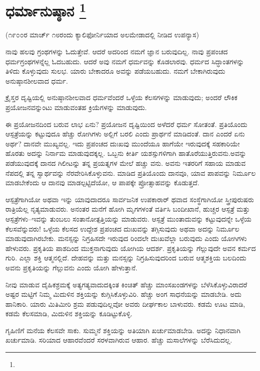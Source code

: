 
\chapter[ಧರ್ಮಾನುಷ್ಠಾನ ]{ಧರ್ಮಾನುಷ್ಠಾನ \protect\footnote{}}

\centerline{(೧೯೦೦ರ ಮಾರ್ಚ್​ ೧೮ರಂದು ಕ್ಯಾಲಿಫೋರ್ನಿಯಾದ ಅಲಮೇಡಾದಲ್ಲಿ ನೀಡಿದ ಉಪನ್ಯಾಸ)}

ನಾವು ಹಲವು ಗ್ರಂಥಗಳನ್ನು ಓದುತ್ತೇವೆ. ಆದರೆ ಅದರಿಂದ ನಮಗೆ ಜ್ಞಾನ ಬರುವುದಿಲ್ಲ. ನಾವು ಪ್ರಪಂಚದ ಧರ್ಮಗ್ರಂಥಗಳನ್ನೆಲ್ಲ ಓದಬಹುದು. ಆದರೆ ಅವು ನಮಗೆ ಧರ್ಮವನ್ನು ಕೊಡಲಾರವು. ಧರ್ಮದ ಸಿದ್ಧಾಂತಗಳನ್ನು ತಿಳಿದು ಕೊಳ್ಳುವುದು ಸುಲಭ. ಯಾರು ಬೇಕಾದರೂ ಅವನ್ನು ಪಡೆಯಬಹುದು. ನಮಗೆ ಬೇಕಾಗಿರುವುದು ಅನುಷ್ಠಾನಶೀಲವಾದ ಧರ್ಮ.

ಕ್ರೈಸ್ತರ ದೃಷ್ಟಿಯಲ್ಲಿ ಅನುಷ್ಠಾನಶೀಲವಾದ ಧರ್ಮವೆಂದರೆ ಒಳ್ಳೆಯ ಕೆಲಸಗಳನ್ನು ಮಾಡುವುದು; ಅಂದರೆ ಲೌಕಿಕ ಪ್ರಯೋಜನವನ್ನುಂಟು ಮಾಡುವಂತಹ ಕ್ರಿಯೆಗಳನ್ನು ಮಾಡುವುದು.

ಈ ಪ್ರಯೋಜನದಿಂದ ಬರುವ ಲಾಭ ಏನು? ಪ್ರಯೋಜನ ದೃಷ್ಟಿಯಿಂದ ಅಳೆದರೆ ಧರ್ಮ ಸೋತಂತೆ. ಪ್ರತಿಯೊಂದು ಆಸ್ಪತ್ರೆಯನ್ನು ಕಟ್ಟುವುದೂ ಹೆಚ್ಚು ರೋಗಿಗಳು ಅಲ್ಲಿಗೆ ಬರಲಿ ಎಂದು ಪ್ರಾರ್ಥನೆ ಮಾಡಿದಂತೆ. ದಾನ ಎಂದರೆ ಏನು ಅರ್ಥ? ದಾನವೇ ಮುಖ್ಯವಲ್ಲ. ಇದು ಪ್ರಪಂಚದ ದುಃಖವು ಮುಂದೆಯೂ ಹಾಗೆಯೇ ಇರುವುದಕ್ಕೆ ಸಹಕಾರಿಯೇ ಹೊರತು ಅದನ್ನು ನಿರ್ನಾಮ ಮಾಡುವುದಕ್ಕಲ್ಲ. ಒಬ್ಬನು ಕೀರ್ತಿ ಯಶಸ್ಸುಗಳಿಗಾಗಿ ಹಾತೊರೆಯುತ್ತಿರುವನು.ಅವನ್ನು ಪಡೆಯುವುದಕ್ಕೆ ದಾನದ ಗಿಲೀಟನ್ನು ತನ್ನ ಪ್ರಯತ್ನಗಳ ಮೇಲೆ ಹಚ್ಚು ವನು. ಅವನು ಇತರರಿಗೆ ಸಹಾಯ ಮಾಡುವ ನೆಪದಲ್ಲಿ ತನ್ನ ಸ್ವಾರ್ಥವನ್ನು ನೆರವೇರಿಸಿಕೊಳ್ಳುವನು. ಮಾಡಿದ ಪ್ರತಿಯೊಂದು ದಾನವೂ, ಯಾವ ಪಾಪವನ್ನು ನಿರ್ಮೂಲ ಮಾಡಬೇಕೆಂದು ಆ ದಾನವು ಮಾಡಲ್ಪಟ್ಟಿದೆಯೋ, ಆ ಪಾಪಕ್ಕೇ ಪ್ರೋತ್ಸಾಹವನ್ನು ಕೊಡುತ್ತದೆ.

ಆಸ್ಪತ್ರೆಗಾಗಿಯೋ ಅಥವಾ ಇನ್ನು ಯಾವುದಾದರೂ ಸಾರ್ವಜನಿಕ ಉಪಕಾರಾರ್ ಥವಾದ ಸಂಸ್ಥೆಗಾಗಿಯೋ ಸ್ತ್ರೀಪುರುಷರು ರಾತ್ರಿಯೆಲ್ಲ ನೃತ್ಯಮಾಡುವರು. ಅನಂತರ ಮನೆಗೆ ಹೋಗಿ ಮೃಗಗಳಂತೆ ವರ್ತಿಸಿ ಬಂದೀಖಾನೆ, ಹುಚ್ಚರ ಆಸ್ಪತ್ರೆ ಮತ್ತು ಆಸ್ಪತ್ರೆಗಳು–ಇವನ್ನು ತುಂಬಲು ಸಂತಾನೋತ್ಪತ್ತಿಯನ್ನು ಮಾಡುವರು. ಆಸ್ಪತ್ರೆ ಮುಂತಾದುವನ್ನು ಕಟ್ಟುವುದನ್ನೇ ಒಳ್ಳೆಯ ಕೆಲಸವೆನ್ನುವರು! ಒಳ್ಳೆಯ ಕೆಲಸದ ಉದ್ದೇಶ ಪ್ರಪಂಚದ ದುಃಖವನ್ನು ತಗ್ಗಿಸುವುದು ಅಥವಾ ಅದನ್ನು ನಿರ್ಮೂಲ ಮಾಡುವುದಾಗಿರಬೇಕು. ಮನಸ್ಸನ್ನು ನಿಗ್ರಹಿಸದೇ ಇರುವುದ ರಿಂದಲೇ ದುಃಖವೆಲ್ಲಾ ಬರುವುದು ಎಂದು ಯೋಗಿಗಳು ಹೇಳುವರು. ಪ್ರಕೃತಿಯ ಪಾಶದಿಂದ ಮುಕ್ತನಾಗುವುದು ಯೋಗಿಯ ಆದರ್ಶ. ಪ್ರಕೃತಿಯನ್ನು ಗೆಲ್ಲುವುದೇ ಅವನ ಕರ್ಮದ ಗುರಿ. ಎಲ್ಲಾ ಶಕ್ತಿ ಆತ್ಮನಲ್ಲಿದೆ. ದೇಹವನ್ನು ಮತ್ತು ಮನಸ್ಸನ್ನು ನಿಗ್ರಹಿಸುವುದರಿಂದ ಬರುವ ಆತ್ಮಶಕ್ತಿಯ ಬಲದಿಂದು ಅವನು ಪ್ರಕೃತಿಯನ್ನು ಗೆಲ್ಲುವನು ಎಂದು ಯೋಗಿ ಹೇಳುತ್ತಾನೆ.

ನೀವು ಮಾಡುವ ದೈಹಿಕಶ್ರಮಕ್ಕೆ ಅತ್ಯಗತ್ಯವಾದುದಕ್ಕಿಂತ ಕಿಂಚಿತ್​ ಹೆಚ್ಚು ಮಾಂಸಖಂಡಗಳನ್ನು ಬೆಳೆಸಿಕೊಳ್ಳುವಿರಾದರೆ ಅಷ್ಟರ ಮಟ್ಟಿಗೆ ನಿಮ್ಮ ಮಿದುಳಿನ ಶಕ್ತಿಯನ್ನು ಕುಗ್ಗಿಸಿಕೊಳ್ಳುವಿರಿ. ಹೆಚ್ಚು ಅಂಗ ಸಾಧನೆಯನ್ನು ಮಾಡಬೇಡಿ. ಅದು ಹಾನಿಕಾರಿ. ಯಾರು ಮಿತಿಮೀರಿ ಶ್ರಮ ಪಡುವುದಿಲ್ಲವೋ ಅವರು ದೀರ್ಘಕಾಲ ಬಾಳುವರು. ಕಡಮೆ ಊಟ ಮಾಡಿ, ಕಡಮೆ ಕೆಲಸಮಾಡಿ, ಮಿದುಳಿನ ಶಕ್ತಿಯನ್ನು ಕೂಡಿಟ್ಟುಕೊಳ್ಳಿ.

ಗೃಹಿಣಿಗೆ ಮನೆಯ ಕೆಲಸವೇ ಸಾಕು. ಸುಮ್ಮನೆ ಶಕ್ತಿಯನ್ನು ಅತಿಯಾಗಿ ಖರ್ಚುಮಾಡಬೇಡಿ. ಅದನ್ನು ನಿಧಾನವಾಗಿ ಖರ್ಚುಮಾಡಿ. ಸರಿಯಾದ ಆಹಾರವೆಂದರೆ ಸರಳವಾಗಿರುವ ಆಹಾರ. ಹೆಚ್ಚು ಮಸಾಲೆಗಳನ್ನು ಬೆರೆಸಿದುದಲ್ಲ.

